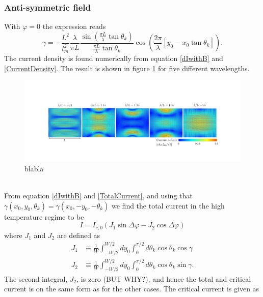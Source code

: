 \subsubsection{Anti-symmetric field}
With $\varphi = 0$ the expression reads
\begin{equation}
    \gamma = -\frac{L^2}{l_m^2}\frac{\lambda}{\pi L }\frac{\sin\left(\frac{\pi L}{\lambda}\tan\theta_k\right)}{\frac{\pi L}{\lambda}\tan\theta_k}\cos\left(\frac{2\pi}{\lambda}\left[y_0-x_0\tan\theta_k\right]\right).
\end{equation}
The current density is found numerically from equation \eqref{dIwithB} and \eqref{CurrentDensity}. The result is shown in figure \ref{fig:dist2_0} for five different wavelengths. 
\begin{figure}[hhh]
\centering
\includegraphics[width=17cm,clip=true,trim = 5.5cm 3.5cm 5cm 5cm]{fig/dist2_0}
\caption{blabla}
\label{fig:dist2_0}
\end{figure}
\\
From equation \eqref{dIwithB} and \eqref{TotalCurrent}, and using that $\gamma(x_0,y_0,\theta_k) = \gamma(x_0,-y_0,-\theta_k)$ we find the total current in the high temperature regime to be
\begin{equation}
I = I_{c,0}\left(J_1\sin\Delta\varphi  - J_2\cos\Delta\varphi\right)
\end{equation}
where $J_1$ and $J_2$ are defined as
\begin{equation}
\begin{split}
    J_1 &\equiv \frac{1}{W}\int_{-W/2}^{W/2}dy_0\int_0^{\pi/2}d\theta_k\cos\theta_k\cos\gamma \\
    J_2 &\equiv \frac{1}{W}\int_{-W/2}^{W/2}dy_0\int_0^{\pi/2}d\theta_k\cos\theta_k\sin\gamma.
\end{split}
\end{equation}
The second integral, $J_2$, is zero (BUT WHY?), and hence the total and critical current is on the same form as for the other cases. The critical current is given as
